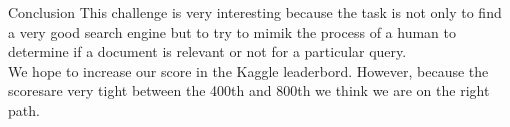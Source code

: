 \documentclass{beamer}
\newlength\postercolumnwidth
\newlength\totalwidth
\begin{document}
\begin{frame}[t]{}
\begin{columns}[totalwidth=\totalwidth]
\begin{column}[t]{\postercolumnwidth}
    \begin{block}{Conclusion}
\small
This challenge is very interesting because the task is not only to find a very good search engine but to try to mimik the process of a human to determine if a document is relevant or not for a particular query. 
\\ We hope to increase our score in the Kaggle leaderbord. However, because the scoresare very tight between the 400th and 800th we think we are on the right path.
    \end{block}
  \end{column}
 \end{columns}

\end{frame}
\end{document}
